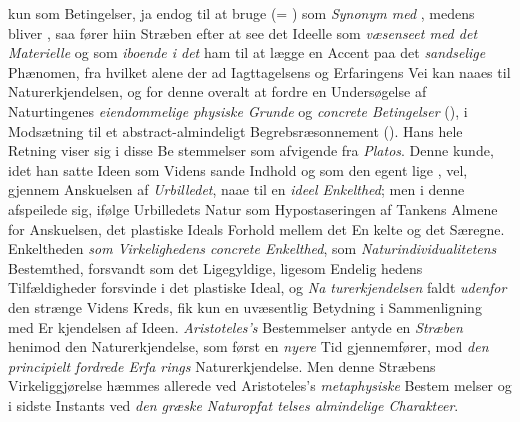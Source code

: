 kun som Betingelser, ja endog til at bruge  (= )
som \emph{Synonym med} \emph{}, medens  bliver , saa fører hiin Stræben efter at see det Ideelle som
\emph{væsenseet med det Materielle} og som \emph{iboende i det}
ham til at lægge en Accent paa det \emph{sandselige} Phænomen,
fra hvilket alene der ad Iagttagelsens og Erfaringens Vei kan
naaes til Naturerkjendelsen, og for denne overalt at fordre en
Undersøgelse af Naturtingenes \emph{eiendommelige physiske
Grunde} og \emph{concrete Betingelser} (), i
Modsætning til et abstract-almindeligt Begrebsræsonnement
(). Hans hele Retning viser sig i disse Be\-%
stemmelser som afvigende fra \emph{Platos}. Denne kunde, idet
han satte Ideen som Videns sande Indhold og som den egent\-%
lige , vel, gjennem Anskuelsen af \emph{Urbilledet}, naae til
en \emph{ideel Enkelthed}; men i denne afspeilede sig, ifølge
Urbilledets Natur som Hypostaseringen af Tankens Almene
for Anskuelsen, det plastiske Ideals Forhold mellem det En\-%
kelte og det Særegne. Enkeltheden \emph{som Virkelighedens
concrete Enkelthed}, som \emph{Naturindividualitetens}
Bestemthed, forsvandt som det Ligegyldige, ligesom Endelig\-%
hedens Tilfældigheder forsvinde i det plastiske Ideal, og \emph{Na\-%
turerkjendelsen} faldt \emph{udenfor} den strænge Videns Kreds,
fik kun en uvæsentlig Betydning i Sammenligning med Er\-%
kjendelsen af Ideen. \emph{Aristoteles's} Bestemmelser antyde en
\emph{Stræben} henimod den Naturerkjendelse, som først en \emph{nyere}
Tid gjennemfører, mod \emph{den principielt fordrede Erfa\-%
rings} Naturerkjendelse. Men denne Stræbens Virkeliggjørelse
hæmmes allerede ved Aristoteles's \emph{metaphysiske} Bestem\-%
melser og i sidste Instants ved \emph{den græske Naturopfat\-%
telses almindelige Charakteer}.

